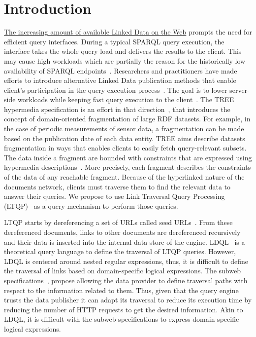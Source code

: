 \section{Introduction}



\href{https://lod-cloud.net/#diagram}{The increasing amount of available Linked Data on the Web} prompts the need for efficient query interfaces.
During a typical SPARQL query execution, the interface takes the whole query load and delivers the results to the client.
This may cause high workloads which are partially the reason for the historically low availability of SPARQL endpoints~\cite{aranda2013}.
Researchers and practitioners have made efforts to introduce alternative Linked Data publication methods that enable client's participation in the query execution process~\cite{Verborgh2016TriplePF}.
The goal is to lower server-side workloads while keeping fast query execution to the client~\cite{Azzam2021}.
The TREE hypermedia specification is an effort in that direction~\cite{ColpaertMaterializedTREE, lancker2021LDS}, that introduces the concept of domain-oriented fragmentation of large RDF datasets.
For example, in the case of periodic measurements of sensor data, a fragmentation can be made based on the publication date of each data entity.
TREE aims describe datasets fragmentation in ways that enables clients to easily fetch query-relevant subsets.
The data inside a fragment are bounded with constraints that are expressed using hypermedia descriptions~\cite{thomasFieldingPhdThesis}.
More precisely, each fragment describes the constraints of the data of any reachable fragment.
Because of the hyperlinked nature of the documents network, clients must traverse them to find the relevant data to answer their queries.
We propose to use Link Traversal Query Processing (LTQP)~\cite{Hartig2016} as a query mechanism to perform those queries.

LTQP starts by dereferencing a set of URLs called seed URLs~\cite{Hartig2016}.
From these dereferenced documents, links to other documents are dereferenced recursively and their data is inserted into the internal data store of the engine.
LDQL~\cite{hartig2016Ldql} is a theoretical query language to define the traversal of LTQP queries.
However, LDQL is centered around nested regular expressions, thus, it is difficult to define the traversal of links based on domain-specific logical expressions.
The subweb specifications~\cite{bogaerts_rulemlrr_2021}, propose allowing the data provider to define traversal paths with respect to the information related to them.
Thus, given that the query engine trusts the data publisher it can adapt its traversal to reduce its execution time by reducing the number of HTTP requests to get the desired information.
Akin to LDQL, it is difficult with the subweb specifications to express domain-specific logical expressions.

